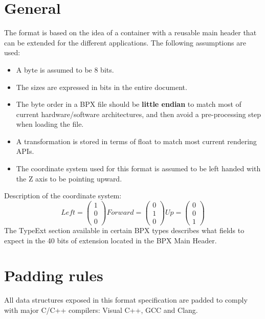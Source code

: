 \section{General}
The format is based on the idea of a container with a reusable main header that can be extended for the different applications.\newline
The following assumptions are used:
\begin{itemize}
    \item A byte is assumed to be 8 bits.
    \item The sizes are expressed in bits in the entire document.
    \item The byte order in a BPX file should be \textbf{little endian} to match most of current hardware/software architectures, and then avoid a pre-processing step when loading the file.
    \item A transformation is stored in terms of float to match most current rendering APIs.
    \item The coordinate system used for this format is assumed to be left handed with the Z axis to be pointing upward.
\end{itemize}
Description of the coordinate system:
\begin{equation}
    Left =
    \begin{pmatrix}
        1 \\
        0 \\
        0
    \end{pmatrix}
    Forward =
    \begin{pmatrix}
        0 \\
        1 \\
        0
    \end{pmatrix}
    Up =
    \begin{pmatrix}
        0 \\
        0 \\
        1
    \end{pmatrix}
\end{equation}
The TypeExt section available in certain BPX types describes what fields to expect in the 40 bits of extension located in the BPX Main Header.

\section{Padding rules}
All data structures exposed in this format specification are padded to comply with major C/C++ compilers: Visual C++, GCC and Clang.